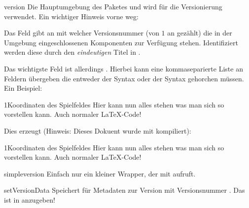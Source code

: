 \documentclass{sopra-base}
\begin{document}
\begin{environment}{version}{}
    Die Hauptumgebung des Paketes und wird für die Versionierung verwendet. Ein wichtiger Hinweis vorne weg: \par{}
    Das Feld  gibt an mit welcher Versionsnummer (von \(1\) an gezählt) die in der Umgebung eingeschlossenen Komponenten zur Verfügung stehen. Identifiziert werden diese durch den \emph{eindeutigen} Titel in .\par{}
    Das wichtigste Feld ist allerdings . Hierbei kann eine kommaseparierte Liste an Feldern übergeben die entweder der Syntax  oder der Syntax  gehorchen müssen. Ein Beispiel:
\begin{latex}
\begin{version}{1}{Koordinaten des Spielfeldes}
    Hier kann nun alles stehen was man sich so vorstellen kann. Auch normaler \LaTeX-Code!
\end{version}
\end{latex}
    Dies erzeugt (Hinweis: Dieses Dokuent wurde mit  kompiliert):\\
\begin{version}{1}{Koordinaten des Spielfeldes}
Hier kann nun alles stehen was man sich so vorstellen kann. Auch normaler \LaTeX-Code!
\end{version}
\end{environment}

\begin{command}{simpleversion}{}
    Einfach nur ein kleiner Wrapper, der  mit  aufruft.
\end{command}

\begin{command}{setVersionData}{}
    Speichert für  Metadaten zur Version mit Versionsnummer . Das  ist in  anzugeben!
\end{command}
\end{document}
